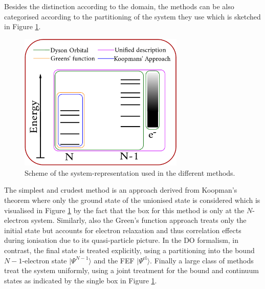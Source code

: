 Besides the distinction according to the domain, the methods can be also categorised according to the partitioning of the system they use which is sketched in Figure \ref{fig:PEScat}.
\begin{figure}
   \includegraphics[width=0.7\textwidth]{Figures/Methods}
   \caption{Scheme of the system-representation used in the different methods.}
   \label{fig:PEScat}
\end{figure}
The simplest and crudest method is an approach derived from Koopman's theorem where only the ground state of the un\-ion\-ised state is considered which is visualised in Figure \ref{fig:PEScat} by the fact that the box for this method is only at the $N$-electron system.
Similarly, also the Green's function approach treats only the initial state but accounts for electron relaxation and thus correlation effects during ionisation due to its quasi-particle picture.
In the DO formalism, in contrast, the final state is treated explicitly, using a partitioning into the bound $N-1$-electron state $|\Psi^{N-1}\rangle$ and the FEF $|\Psi^\text{el}\rangle$.
Finally a large class of methods treat the system uniformly, using a joint treatment for the bound and continuum states as indicated by the single box in Figure \ref{fig:PEScat}.


